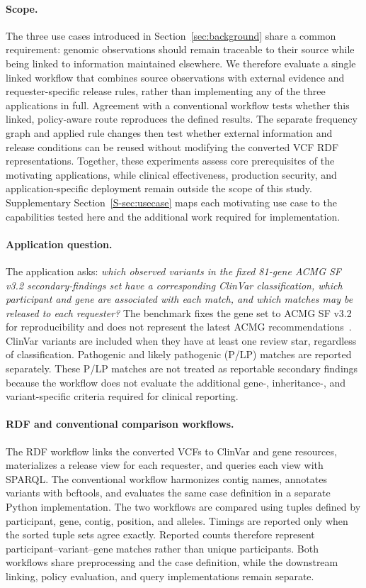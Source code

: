 \documentclass[pdflatex,sn-mathphys-num]{sn-jnl}
\begin{document}
\paragraph{Scope.}
The three use cases introduced in Section~\ref{sec:background} share a common requirement: genomic observations should remain traceable to their source while being linked to information maintained elsewhere.
We therefore evaluate a single linked workflow that combines source observations with external evidence and requester-specific release rules, rather than implementing any of the three applications in full.
Agreement with a conventional workflow tests whether this linked, policy-aware route reproduces the defined results.
The separate frequency graph and applied rule changes then test whether external information and release conditions can be reused without modifying the converted VCF RDF representations.
Together, these experiments assess core prerequisites of the motivating applications, while clinical effectiveness, production security, and application-specific deployment remain outside the scope of this study.
Supplementary Section~\ref{S-sec:usecase} maps each motivating use case to the capabilities tested here and the additional work required for implementation.

\paragraph{Application question.}
The application asks: \emph{which observed variants in the fixed 81-gene ACMG SF v3.2 secondary-findings set have a corresponding ClinVar classification, which participant and gene are associated with each match, and which matches may be released to each requester?}
The benchmark fixes the gene set to ACMG SF v3.2 for reproducibility and does not represent the latest ACMG recommendations~\cite{miller2023acmg}.
ClinVar variants are included when they have at least one review star, regardless of classification.
Pathogenic and likely pathogenic (P/LP) matches are reported separately.
These P/LP matches are not treated as reportable secondary findings because the workflow does not evaluate the additional gene-, inheritance-, and variant-specific criteria required for clinical reporting.

\paragraph{RDF and conventional comparison workflows.}
The RDF workflow links the converted VCFs to ClinVar and gene resources, materializes a release view for each requester, and queries each view with SPARQL.
The conventional workflow harmonizes contig names, annotates variants with bcftools, and evaluates the same case definition in a separate Python implementation.
The two workflows are compared using tuples defined by participant, gene, contig, position, and alleles.
Timings are reported only when the sorted tuple sets agree exactly.
Reported counts therefore represent participant--variant--gene matches rather than unique participants.
Both workflows share preprocessing and the case definition, while the downstream linking, policy evaluation, and query implementations remain separate.
\end{document}
